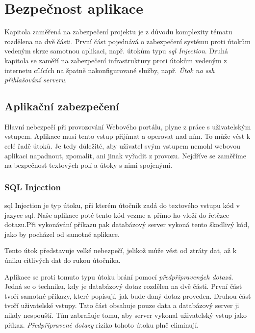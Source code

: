 \section{Bezpečnost aplikace}
\label{sec:security}

Kapitola zaměřená na zabezpečení projektu \bso je z důvodu komplexity tématu rozdělena na dvě části.  První část pojednává o zabezpečení systému proti útokům vedeným skrze samotnou aplikaci, např. útokům typu \emph{\acrshort{sql} Injection}. Druhá kapitola se zaměří na zabezpečení infrastruktury proti útokům vedeným z internetu cílících na špatně nakonfigurované služby, např. \emph{Útok na \acrshort{ssh} přihlašování serveru}.

\subsection{Aplikační zabezpečení}

Hlavní nebezpečí při provozování Webového portálu, plyne z práce s uživatelským vstupem. Aplikace musí tento vstup přijímat a operovat nad ním. To může vést k celé řadě útoků. Je tedy důležité, aby uživatel svým vstupem nemohl webovou aplikaci napadnout, zpomalit, ani jinak vyřadit z provozu. Nejdříve se zaměříme na bezpečnost textových polí a útoky s nimi spojenými.

\subsubsection{SQL Injection}

\acrshort{sql} Injection\cite{sqlinject} je typ útoku, při kterém útočník zadá do textového vstupu kód v jazyce \acrshort{sql}. Naše aplikace poté tento kód vezme a přímo ho vloží do řetězce dotazu.Při vykonávání příkazu pak databázový server vykoná tento škodlivý kód, jako by pocházel od samotné aplikace.

Tento útok představuje velké nebezpečí, jelikož může vést od ztráty dat, až k úniku citlivých dat do rukou útočníka.

Aplikace \bso se proti tomuto typu útoku brání pomocí \emph{předpřipravených dotazů}\cite{mysqlprepstmt}. Jedná se o techniku, kdy je databázový dotaz rozdělen na dvě části. První část tvoří samotné příkazy, které popisují, jak bude daný dotaz proveden. Druhou část tvoří uživatelské vstupy. Tato část obsahuje pouze data a databázový server ji nikdy nespouští. Tím zabraňuje tomu, aby server vykonal uživatelský vstup jako příkaz. \emph{Předpřipravené dotazy}\cite{mysqlprepstmt} riziko tohoto útoku plně eliminují.

